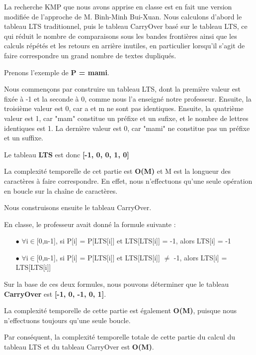 \documentclass[11pt,english]{article}
\begin{document}
La recherche KMP que nous avons apprise en classe est en fait une version modifiée de l'approche de M. Binh-Minh Bui-Xuan. Nous calculons d'abord le tableau LTS traditionnel, puis le tableau CarryOver basé sur le tableau LTS, ce qui réduit le nombre de comparaisons sous les bandes frontières ainsi que les calculs répétés et les retours en arrière inutiles, en particulier lorsqu'il s'agit de faire correspondre un grand nombre de textes dupliqués.

\indent Prenons l'exemple de \textbf{P = mami}.

\indent Nous commençons par construire un tableau LTS, dont la première valeur est fixée à -1 et la seconde à 0, comme nous l'a enseigné notre professeur.
Ensuite, la troisième valeur est 0, car a et m ne sont pas identiques.
Ensuite, la quatrième valeur est 1, car "mam" constitue un préfixe et un sufixe, et le nombre de lettres identiques est 1.
La dernière valeur est 0, car "mami" ne constitue pas un préfixe et un suffixe.

\indent Le tableau \textbf{LTS} est donc \textbf{[-1, 0, 0, 1, 0]} 

\indent La complexité temporelle de cet partie est \textbf{O(M)} et M est la longueur des caractères à faire correspondre.
En effet, nous n'effectuons qu'une seule opération en boucle sur la chaîne de caractères.

\indent Nous construisons ensuite le tableau CarryOver.

\indent En classe, le professeur avait donné la formule suivante :

\begin{itemize}
    \item [$\bullet$] $\forall$i$\in$[0,n-1], si P[i] = P[LTS[i]] et LTS[LTS[i]] = -1, alors LTS[i] = -1 
    \item [$\bullet$] $\forall$i$\in$[0,n-1], si P[i] = P[LTS[i]] et LTS[LTS[i]] $\neq$ -1, alors LTS[i] = LTS[LTS[i]]
\end{itemize}

\indent Sur la base de ces deux formules, nous pouvons déterminer que le tableau \textbf{CarryOver} est \textbf{[-1, 0, -1, 0, 1]}.

\indent La complexité temporelle de cette partie est également \textbf{O(M)}, puisque nous n'effectuons toujours qu'une seule boucle.

\indent Par conséquent, la complexité temporelle totale de cette partie du calcul du tableau LTS et du tableau CarryOver est \textbf{O(M)}.
\end{document}
